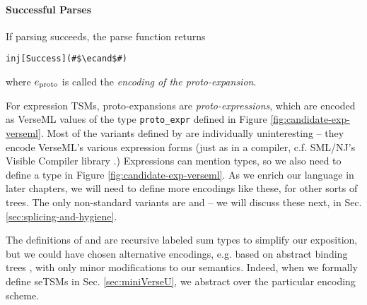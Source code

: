 \paragraph{Successful Parses} If parsing succeeds, the parse function returns 
\begin{lstlisting}[numbers=none]
inj[Success](#$\ecand$#)
\end{lstlisting} 
where $e_\text{proto}$ is called the \emph{encoding of the proto-expansion}. 

For expression TSMs, proto-expansions are \emph{proto-expressions}, which are encoded as VerseML values of the type \lstinline{proto_expr} defined in Figure \ref{fig:candidate-exp-verseml}.
Most of the variants defined by  are individually uninteresting -- they encode VerseML's various expression forms (just as in a compiler, c.f. SML/NJ's Visible Compiler library \cite{SML/VisibleCompiler}.) 
Expressions can mention types, so we also need to define a type  in Figure \ref{fig:candidate-exp-verseml}. As we enrich our language in later chapters, we will need to define more encodings like these, for other sorts of trees. The only non-standard variants are  and  -- we will discuss these next, in Sec. \ref{sec:splicing-and-hygiene}. 

The definitions of  and  are recursive labeled sum types to simplify our exposition, but we could have chosen alternative encodings, e.g. based on abstract binding trees \cite{pfpl}, with only minor modifications to our semantics. Indeed, when we formally define seTSMs in Sec. \ref{sec:miniVerseU}, we abstract over the particular encoding scheme.





